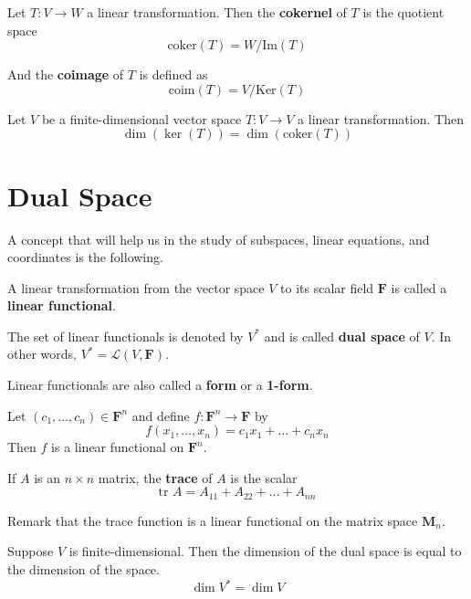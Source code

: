 \begin{definition}
	Let $T : V \longrightarrow W$ a linear transformation. Then the \textbf{cokernel} of $T$ is the quotient space
	\[
		\text{coker} (T) = W / \text{Im}(T)
	\] 

	And the \textbf{coimage} of $T$ is defined as
	\[
		\text{coim} (T) = V / \text{Ker}(T)
	\]
\end{definition}

\begin{corollary}
	Let $V$ be a finite-dimensional vector space $T : V \longrightarrow V$ a linear transformation. Then 
	\[
		\dim (\ker (T)) = \dim (\text{coker} (T))
	\]
\end{corollary}

\section{Dual Space}

A concept that will help us in the study of subspaces, linear equations, and coordinates is the following.

\begin{definition}
	A linear transformation from the vector space $V$ to its scalar field $\textbf{F}$ is called a \textbf{linear functional}.
	
	The set of linear functionals is denoted by $V^\ast$ and is called \textbf{dual space} of $V$. In other words, $V^\ast = \mathcal{L}(V, \textbf{F})$.
\end{definition}

Linear functionals are also called a \textbf{form} or a \textbf{1-form}.

\begin{example}
	Let $(c_1, \ldots, c_n) \in \textbf{F}^n$ and define $f : \textbf{F}^n \longrightarrow \textbf{F}$ by 
	\[
		f(x_1, \ldots, x_n) = c_1 x_1 + \ldots + c_n x_n
	\]
	Then $f$ is a linear functional on $\textbf{F}^n$.
\end{example}

\begin{example}[Trace]
	If $A$ is an $n \times n$ matrix, the \textbf{trace} of $A$ is the scalar
	\[
		\text{tr } A = A_{11} + A_{22} + \ldots + A_{nn}
	\]
	
	Remark that the trace function is a linear functional on the matrix space $\textbf{M}_n$.
\end{example}

\begin{remark}
	Suppose $V$ is finite-dimensional. Then the dimension of the dual space is equal to the dimension of the space.
	\[
		\dim V^\ast = \dim V
	\]
\end{remark}

